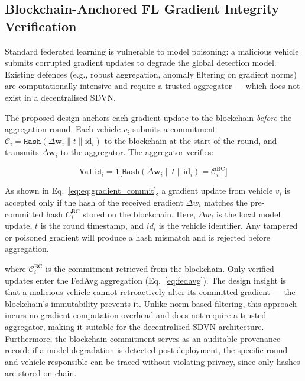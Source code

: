 \documentclass[12pt, a4paper]{report}
\begin{document}
\subsection{Blockchain-Anchored FL Gradient Integrity Verification}

Standard federated learning is vulnerable to model poisoning: a malicious
vehicle submits corrupted gradient updates to degrade the global detection
model. Existing defences (e.g., robust aggregation, anomaly filtering on
gradient norms) are computationally intensive and require a trusted
aggregator — which does not exist in a decentralised SDVN.

The proposed design anchors each gradient update to the blockchain
\emph{before} the aggregation round. Each vehicle $v_i$ submits a
commitment $\mathcal{C}_i = \texttt{Hash}(\Delta\mathbf{w}_i \| t \| \mathrm{id}_i)$
to the blockchain at the start of the round, and transmits
$\Delta\mathbf{w}_i$ to the aggregator. The aggregator verifies:

\begin{equation}
\label{eq:gradient_commit}
\texttt{Valid}_i = \mathbf{1}\bigl[
\texttt{Hash}(\Delta\mathbf{w}_i \| t \| \mathrm{id}_i) =
\mathcal{C}_i^{\mathrm{BC}}
\bigr]
\end{equation}

As shown in Eq.~\eqref{eq:eq:gradient_commit}, a gradient update from vehicle $v_i$ is accepted only if the hash of the received gradient $\Delta w_i$ matches the pre-committed hash $C_i^{\text{BC}}$ stored on the blockchain. Here, $\Delta w_i$ is the local model update, $t$ is the round timestamp, and $id_i$ is the vehicle identifier. Any tampered or poisoned gradient will produce a hash mismatch and is rejected before aggregation.

\noindent where $\mathcal{C}_i^{\mathrm{BC}}$ is the commitment retrieved
from the blockchain. Only verified updates enter the FedAvg aggregation
(Eq.~\eqref{eq:fedavg}). The design insight is that a malicious vehicle
cannot retroactively alter its committed gradient — the blockchain's
immutability prevents it. Unlike norm-based filtering, this approach
incurs no gradient computation overhead and does not require a trusted
aggregator, making it suitable for the decentralised SDVN architecture.
Furthermore, the blockchain commitment serves as an auditable provenance
record: if a model degradation is detected post-deployment, the specific
round and vehicle responsible can be traced without violating privacy,
since only hashes are stored on-chain.
\end{document}
